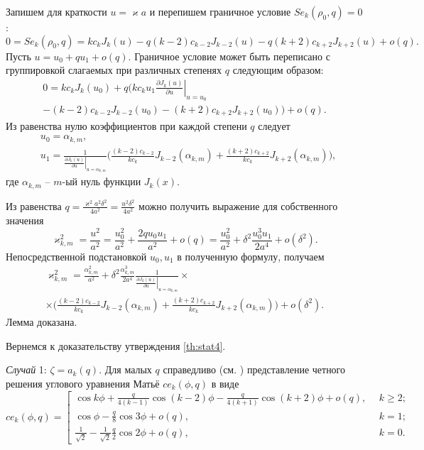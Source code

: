 Запишем для краткости $u = \varkappa a$ и перепишем граничное условие $Se_k(\rho_0, q) = 0$:
$$0 = Se_k(\rho_0, q) =
	k c_k J_k(u) 
	- q (k-2) c_{k-2} J_{k-2}(u) -
	q (k+2) c_{k+2} J_{k+2}(u) + o(q).$$
Пусть $u = u_0 + q u_1 + o(q)$. Граничное условие может быть переписано с группировкой слагаемых при различных степенях $q$ следующим образом:
\begin{multline*}
0 =
	k c_k J_k(u_0) + q \biggl(
	k c_k u_1 \left.\frac{\partial  J_k(u)}{\partial u}\right|_{u=u_0} \\
	-  (k-2) c_{k-2} J_{k-2}(u_0) - (k+2) c_{k+2} J_{k+2}(u_0) 
	\biggr)+ o(q).
\end{multline*}
Из равенства нулю коэффициентов при каждой степени $q$ следует
\begin{align*}
&u_0 = \alpha_{k, m}, \\
&u_1 = \frac{1}{\left.\frac{\partial J_{k} (u)}{\partial u}\right|_{u=\alpha_{k, m}}} 
\biggl(
\frac{(k-2)c_{k-2}}{k c_k} J_{k-2}(\alpha_{k, m}) + \frac{(k+2)c_{k+2} }{k c_k} J_{k+2}(\alpha_{k, m})
\biggr),
\end{align*}
где $\alpha_{k, m}$ -- $m$-ый нуль функции $J_k(x)$.  

Из равенства $q=\frac{\varkappa^2 a^2 \delta^2}{4 a^2}=\frac{u^2 \delta^2}{4a^2}$ можно получить выражение для собственного значения
$$\varkappa_{k, m}^2 = \frac{u^2}{a^2} = \frac{u_0^2}{a^2} + \frac{2 q u_0 u_1}{a^2} + o(q)= \frac{u_0^2}{a^2} +  \delta^2 \frac{u_0^3 u_1}{2 a^4} + o(\delta^2).$$ 
Непосредственной подстановкой $u_0, u_1$ в полученную формулу, получаем
\begin{multline*}
\varkappa_{k, m}^2 = 
\frac{\alpha_{k, m}^2}{a^2} +  \delta^2 \frac{\alpha_{k, m}^3}{2 a^4}\frac{1}{\left.\frac{\partial J_{k} (u)}{\partial u}\right|_{u=\alpha_{k, m}}} \times \\ \times
\biggl(
\frac{(k-2)c_{k-2}}{k c_k} J_{k-2}(\alpha_{k, m}) + \frac{(k+2)c_{k+2} }{k c_k} J_{k+2}(\alpha_{k, m})
\biggr) + o(\delta^2).
\end{multline*}
Лемма доказана.

Вернемся к доказательству утверждения \ref{th:stat4}.

\textit{Случай} 1: $\zeta = a_k(q)$.
Для малых $q$ справедливо (см. \cite{wref2}) представление четного решения углового уравнения Матьё $ce_k(\phi, q)$ в виде 
{
\[
ce_k(\phi, q) = 
\left[
\begin{array}{ll}
	\cos{k\phi} + 
	\frac{q}{4(k-1)} \cos{(k-2)\phi} - 
	\frac{q}{4(k+1)} \cos{(k+2)\phi} + o(q), \ \ & k \geq 2;\\
	\cos{\phi} - \frac{q}{8} \cos{3 \phi} + o(q), & k = 1; \\
	\frac{1}{\sqrt{2}} - \frac{1}{\sqrt{2}}\frac{q}{2}\cos{2 \phi} + o(q), & k = 0. 
\end{array}
\right.
\]
}


